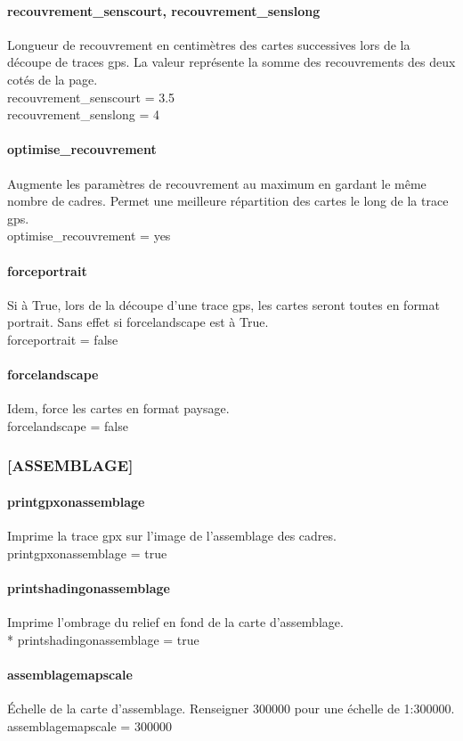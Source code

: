 \documentclass[12pt,french]{article}
\begin{document}
\paragraph{recouvrement\_senscourt, recouvrement\_senslong} Longueur de recouvrement en centimètres des cartes successives lors de la découpe de traces gps. La valeur représente la somme des recouvrements des deux cotés de la page. \\
recouvrement\_senscourt = 3.5\\
recouvrement\_senslong = 4
\paragraph{optimise\_recouvrement} Augmente les paramètres de recouvrement au maximum en gardant le même nombre de cadres. Permet une meilleure répartition des cartes le long de la trace gps.\\
optimise\_recouvrement = yes
\paragraph{forceportrait} Si à True, lors de la découpe d'une trace gps, les cartes seront toutes en format portrait. Sans effet si forcelandscape est à True. \\
forceportrait = false
\paragraph{forcelandscape} Idem, force les cartes en format paysage. \\
forcelandscape = false

\subsubsection{[ASSEMBLAGE]}
\paragraph{printgpxonassemblage} Imprime la trace gpx sur l'image de l'assemblage des cadres.\\
printgpxonassemblage = true
\paragraph{printshadingonassemblage} Imprime l'ombrage du relief en fond de la carte d'assemblage.\\*
printshadingonassemblage = true
\paragraph{assemblagemapscale} Échelle de la carte d'assemblage. Renseigner 300000 pour une échelle de {\shorthandoff{:}1:300000.}\\
assemblagemapscale = 300000
\end{document}
